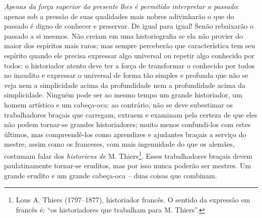 \emph{Apenas da força superior do presente lhes é permitido interpretar
o passado}: apenas sob a pressão de suas qualidades mais nobres
adivinharão o que do passado é digno de conhecer e preservar. De igual
para igual! Senão rebaixarão o passado a si mesmos. Não creiam em uma
historiografia se ela não provier do maior dos espíritos mais raros; mas
sempre perceberão que característica tem seu espírito quando ele precisa
expressar algo universal ou repetir algo conhecido por todos: o
historiador atento deve ter a força de transformar o conhecido por todos
no inaudito e expressar o universal de forma tão simples e profunda que
não se veja nem a simplicidade acima da profundidade nem a profundidade
acima da simplicidade. Ninguém pode ser ao mesmo tempo um grande
historiador, um homem artístico e um cabeça-oca: ao contrário, não se
deve subestimar os trabalhadores braçais que carregam, extraem e
examinam pela certeza de que eles não podem tornar-se grandes
historiadores; muito menos confundi-los com estes últimos, mas
compreendê-los como aprendizes e ajudantes braçais a serviço do mestre,
assim como os franceses, com mais ingenuidade do que os alemães,
costumam falar dos \emph{historiens de} M. Thiers\footnote{Lous A.
  Thiers (1797--1877), historiador francês. O sentido da expressão em
  francês é: ``os historiadores que trabalham para M. Thiers''.}. Esses
trabalhadores braçais devem paulatinamente tornar-se eruditos, mas por
isso nunca poderão ser mestres. Um grande erudito e um grande cabeça-oca
-- duas coisas que combinam.

